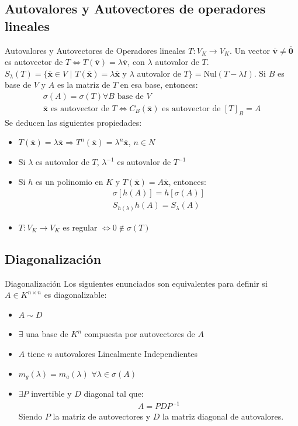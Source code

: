 \documentclass[a4paper, twoside]{article}
\numberwithin{equation}{section}
\numberwithin{figure}{section}
\numberwithin{table}{section}
\newcommand{\vect}[1]{\overline{\textbf{#1}}}
\newcommand{\nul}[1]{\text{Nul}(#1)}
\begin{document}
\subsection{Autovalores y Autovectores de operadores lineales}
\begin{definicion*}{Autovalores y Autovectores de Operadores lineales}
	$T:V_K \to V_K$. Un vector $\vect{v} \neq \vect{0}$ es autovector de $T \Longleftrightarrow T(\vect{v})=\lambda \vect{v}$, con $\lambda$ autovalor de $T$.\\
	$S_\lambda(T)=\{ \vect{x} \in V$ $\vert$ $T(\vect{x})=\lambda \vect{x}$ y $\lambda$ autovalor de $T\}=\nul{T-\lambda I}$. Si $B$ es base de $V$ y $A$ es la matriz de $T$ en esa base, entonces:
	\begin{align}
		\sigma(A)=\sigma(T) \forall B \text{ base de } V \\
		\vect{x} \text{ es autovector de } T \Longleftrightarrow C_B(\vect{x}) \text{ es autovector de } [T]_B=A
	\end{align}
	Se deducen las siguientes propiedades:
	\begin{itemize}
		\item $T(\vect{x})=\lambda \vect{x} \Rightarrow T^n(\vect{x})=\lambda^n \vect{x}$, $n \in N$
		\item Si $\lambda$ es autovalor de $T$, $\lambda^{-1}$ es autovalor de $T^{-1}$
		\item Si $h$ es un polinomio en $K$ y $T(\vect{x})=A\vect{x}$, entonces:
		\begin{align}
			\sigma[h(A)]=h[\sigma(A)] \\
			S_{h(\lambda)}h(A)=S_\lambda(A)
		\end{align}
		\item $T:V_K \to V_K$ es regular $\Longleftrightarrow 0 \notin \sigma(T)$
	\end{itemize}
\end{definicion*}

\subsection{Diagonalización}
\begin{definicion*}{Diagonalización}
	Los siguientes enunciados son equivalentes para definir si $A \in K^{n \times n}$ es diagonalizable:
	\begin{itemize}
		\item $A \sim D$
		\item $\exists$ una base de $K^n$ compuesta por autovectores de $A$
		\item $A$ tiene $n$ autovalores Linealmente Independientes 
		\item $m_g(\lambda)=m_a(\lambda)$ $\forall \lambda \in \sigma(A)$
		\item $\exists P$ invertible y $D$ diagonal tal que:
		\begin{align}
			A=PDP^{-1}
		\end{align}
		Siendo $P$ la matriz de autovectores y $D$ la matriz diagonal de autovalores.
	\end{itemize}
\end{definicion*}
\end{document}
